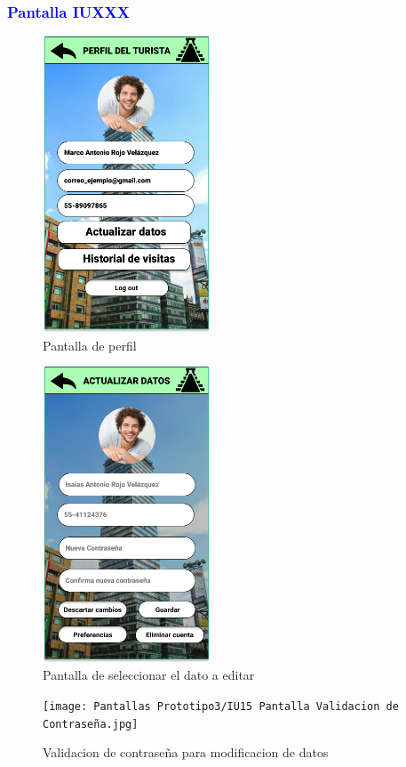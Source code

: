 \subsubsection{\textcolor{blue}{Pantalla IUXXX}}
\begin{figure}[htbp]
        \centering
        \includegraphics[width= 5cm]{Pantallas Prototipo3/IU14 Pantalla de perfil.jpg}
        \caption{Pantalla de perfil}
        \label{fig:enter-label}
\end{figure}
\begin{figure}[htbp]
    \centering
    \includegraphics[width= 5cm]{Pantallas Prototipo3/IU16 Pantalla de seleccionar el dato a editar.jpg}
    \caption{Pantalla de seleccionar el dato a editar}
    \label{fig:enter-label}
\end{figure}

\begin{figure}[htbp]
        \centering
        \texttt{[image: Pantallas Prototipo3/IU15 Pantalla Validacion de Contraseña.jpg]}
        \caption{Validacion de contraseña para modificacion de datos}
        \label{fig:enter-label}
\end{figure}

